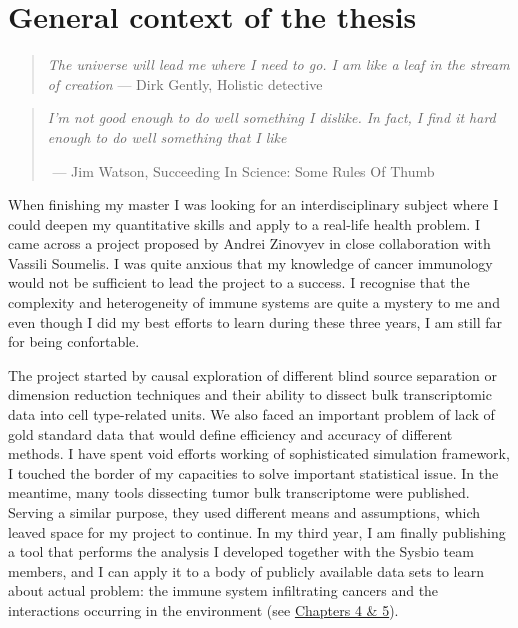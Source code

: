 \documentclass[12pt,]{book}
\theoremstyle{definition}
\theoremstyle{definition}
\theoremstyle{definition}
\theoremstyle{remark}
\begin{document}
\hypertarget{general-context-of-the-thesis}{%
\section*{General context of the
thesis}\label{general-context-of-the-thesis}}

\begin{quote}
\emph{The universe will lead me where I need to go. I am like a leaf in
the stream of creation} --- Dirk Gently, Holistic detective
\end{quote}

\begin{quote}
\emph{I'm not good enough to do well something I dislike. In fact, I
find it hard enough to do well something that I like}

​ --- Jim Watson, Succeeding In Science: Some Rules Of Thumb
\end{quote}

When finishing my master I was looking for an interdisciplinary subject
where I could deepen my quantitative skills and apply to a real-life
health problem. I came across a project proposed by Andrei Zinovyev in
close collaboration with Vassili Soumelis. I was quite anxious that my
knowledge of cancer immunology would not be sufficient to lead the
project to a success. I recognise that the complexity and heterogeneity
of immune systems are quite a mystery to me and even though I did my
best efforts to learn during these three years, I am still far for being
confortable.

The project started by causal exploration of different blind source
separation or dimension reduction techniques and their ability to
dissect bulk transcriptomic data into cell type-related units. We also
faced an important problem of lack of gold standard data that would
define efficiency and accuracy of different methods. I have spent void
efforts working of sophisticated simulation framework, I touched the
border of my capacities to solve important statistical issue. In the
meantime, many tools dissecting tumor bulk transcriptome were published.
Serving a similar purpose, they used different means and assumptions,
which leaved space for my project to continue. In my third year, I am
finally publishing a tool that performs the analysis I developed
together with the Sysbio team members, and I can apply it to a body of
publicly available data sets to learn about actual problem: the immune
system infiltrating cancers and the interactions occurring in the
environment (see \protect\hyperlink{deconica}{Chapters 4 \& 5}).
\end{document}
